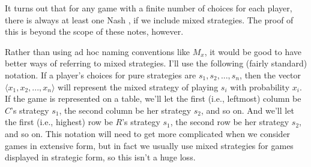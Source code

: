 It turns out that for any game with a finite number of choices for each player, there is always at least one Nash \Eqm, if we include mixed strategies. The proof of this is beyond the scope of these notes, however. 

Rather than using ad hoc naming conventions like $M_x$, it would be good to have better ways of referring to mixed strategies. I'll use the following (fairly standard) notation. If a player's choices for pure strategies are $s_1, s_2, ..., s_n$, then the vector $\langle x_1, x_2, ..., x_n\rangle$ will represent the mixed strategy of playing $s_i$ with probability $x_i$. If the game is represented on a table, we'll let the first (i.e., leftmost) column be $C$'s strategy $s_1$, the second column be her strategy $s_2$, and so on. And we'll let the first (i.e., highest) row be $R$'s strategy $s_1$, the second row be her strategy $s_2$, and so on. This notation will need to get more complicated when we consider games in extensive form, but in fact we usually use mixed strategies for games displayed in strategic form, so this isn't a huge loss.
